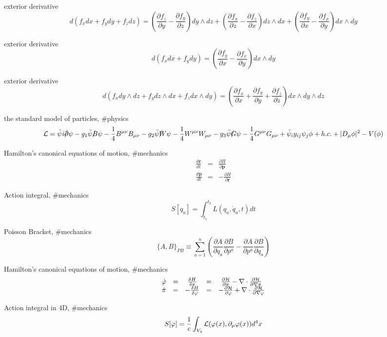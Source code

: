 exterior derivative
$$
d\left(f_x dx+f_y dy+f_z dz\right)=\left(\frac{\partial f_z}{\partial y}-\frac{\partial f_y}{\partial z}\right)dy\wedge dz+\left(\frac{\partial f_x}{\partial z}-\frac{\partial f_z}{\partial x}\right)dz\wedge dx+\left(\frac{\partial f_y}{\partial x}-\frac{\partial f_x}{\partial y}\right)dx\wedge dy
$$

exterior derivative
$$
d\left(f_x dx+f_y dy\right)=\left(\frac{\partial f_y}{\partial x}-\frac{\partial f_x}{\partial y}\right)dx \wedge dy
$$

exterior derivative
$$
d(f_x dy\wedge dz+f_y dz \wedge dx+ f_z dx \wedge dy)=\left(\frac{\partial f_x}{\partial x}+\frac{\partial f_y}{\partial y}+\frac{\partial f_z}{\partial z}\right)dx\wedge dy\wedge dz
$$


the standard model of particles, #physics
\newcommand{\Slash}[1]{{\ooalign{\hfil$#1$\hfil\crcr\raise.167ex\hbox{/}}}}
$$
{\cal L}={\bar\psi}{\it i}{\Slash\partial}{\psi}-g_1 {\bar\psi}{\Slash B}\psi-\frac{1}{4}B^{\mu\nu}B_{\mu\nu}-g_2 {\bar\psi} {\Slash W}\psi-\frac{1}{4}W^{\mu\nu}W_{\mu\nu}-g_3 {\bar\psi} {\Slash G}\psi-\frac{1}{4}G^{\mu\nu}G_{\mu\nu}+{\bar\psi_i}y_{ij}\psi_j\phi+h.c.+|D_\mu \phi|^2-V(\phi)
$$


Hamilton's canonical equations of motion, #mechanics
$$
\begin{array}{lll}
\frac{d{\boldsymbol r}}{dt}&=&\frac{\partial H}{\partial{\boldsymbol p}} \\
\frac{d{\boldsymbol p}}{dt}&=&-\frac{\partial H}{\partial{\boldsymbol r}}
\end{array}
$$

Action integral,  #mechanics
$$
S[q_a]=\int^{t_2}_{t_1}L(q_a,{\dot q_a},t)dt
$$

Poisson Bracket,  #mechanics
$$
\{A,B\}_{PB}\equiv\sum^n_{a=1}\left(\frac{\partial A}{\partial q_a}\frac{\partial B}{\partial p^a}-\frac{\partial A}{\partial p^a}\frac{\partial B}{\partial q_a}\right)
$$

Hamilton's canonical equations of motion, #mechanics
$$
\begin{array}{ccccc}
{\dot \varphi}&=&\frac{\delta H}{\delta \pi}&=&\frac{\partial {\cal H}}{\partial \pi}-\nabla\cdot\frac{\partial {\cal H}}{\partial\nabla\pi} \\
{\dot \pi}&=&-\frac{\delta H}{\delta \varphi}&=&-\frac{\partial {\cal H}}{\partial \varphi}+\nabla\cdot\frac{\partial {\cal H}}{\partial\nabla\varphi}
\end{array}
$$

Action integral in 4D, #mechanics
$$
S[\varphi]=\frac{1}{c}\int_{V_4}{\cal L}(\varphi(x),\partial_\mu \varphi(x))d^4 x
$$

